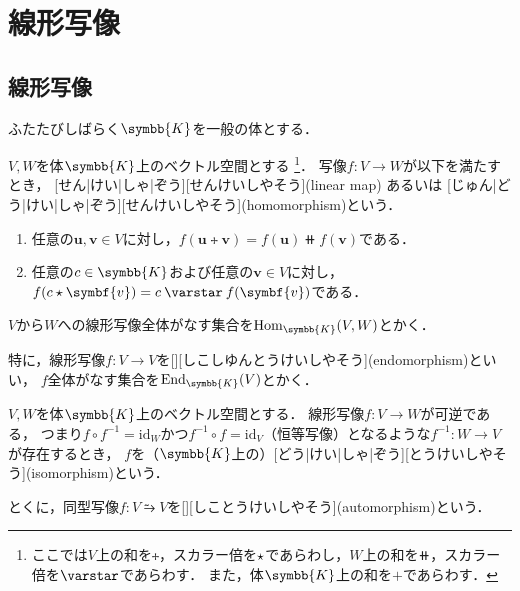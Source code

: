 \documentclass[../sotsu.tex]{subfiles}
\begin{document}
\section{線形写像}

\subsection{線形写像}

ふたたびしばらく$\symbb{K}$を一般の体とする．

\begin{definition}[線形写像]
    \label{dfn:linear-map}
    $V, W$を体$\symbb{K}$上のベクトル空間とする
    \footnote{ここでは$V$上の和を$\tplus$，スカラー倍を$\mathbin{\star}$であらわし，$W$上の和を$\doubleplus$，スカラー倍を$\scaprodvar$であらわす．
    また，体$\symbb{K}$上の和を$+$であらわす．}．
    写像$f \colon V \to W$が以下を満たすとき，
    [せん|けい|しゃ|ぞう][せんけいしやそう](linear map)
    あるいは
    [じゅん|どう|けい|しゃ|ぞう][せんけいしやそう](homomorphism)という\cite[\S 2.1]{saito-lin-2007}．
    \begin{enumerate}
        \item 任意の$\symbf{u}, \symbf{v} \in V$に対し，$f(\symbf{u} \tplus \symbf{v}) = f(\symbf{u}) \doubleplus f(\symbf{v})$である．
        \item 任意の$c \in \symbb{K}$および任意の$\symbf{v} \in V$に対し，$f(c \scaprod \symbf{v}) = c \scaprodvar f(\symbf{v})$である．
    \end{enumerate}
    $V$から$W$への線形写像全体がなす集合を$\mathrm{Hom}_{\symbb{K}}(V, W)$とかく\cite[\S 4.4]{saito-lin-2007}．

    特に，線形写像$f \colon V \to V$を[][しこしゆんとうけいしやそう](endomorphism)といい，
    $f$全体がなす集合を$\mathrm{End}_{\symbb{K}}(V)$とかく\cite[\S 2.1, \S 4.4]{saito-lin-2007}．
\end{definition}


\begin{definition}[同型写像]
    \label{dfn:isomorphism}
    $V, W$を体$\symbb{K}$上のベクトル空間とする．
    線形写像$f \colon V \to W$が可逆である，
    つまり$f \circ f^{-1} = \mathrm{id}_W$かつ$f^{-1} \circ f = \mathrm{id}_V$（恒等写像）となるような$f^{-1} \colon W \to V$が存在するとき，
    $f$を（$\symbb{K}$上の）[どう|けい|しゃ|ぞう][とうけいしやそう](isomorphism)という．

    とくに，同型写像$f \colon V \similarrightarrow V$を[][しことうけいしやそう](automorphism)という\cite[\S 2.1]{saito-lin-2007}．
\end{definition}
\end{document}
